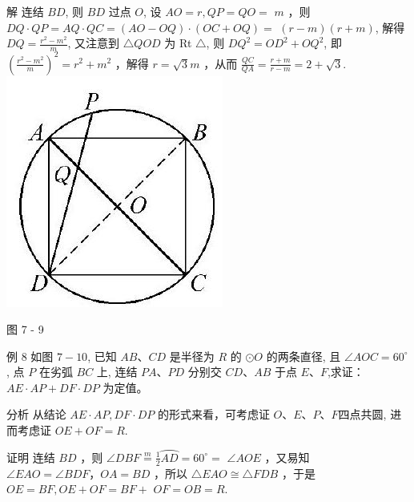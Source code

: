 \documentclass[10pt]{article}
\begin{document}
解 连结 $B D$, 则 $B D$ 过点 $O$, 设 $A O=r, Q P=Q O=$ $m$ ，则 $D Q \cdot Q P=A Q \cdot Q C=(A O-O Q) \cdot(O C+O Q)=$ $(r-m)(r+m)$, 解得 $D Q=\frac{r^{2}-m^{2}}{m}$, 又注意到 $\triangle Q O D$ 为 Rt $\triangle$, 则 $D Q^{2}=O D^{2}+O Q^{2}$, 即 $\left(\frac{r^{2}-m^{2}}{m}\right)^{2}=r^{2}+m^{2}$ ，解得 $r=\sqrt{3} m$ ，从而 $\frac{Q C}{Q A}=\frac{r+m}{r-m}=2+\sqrt{3}$.\\
\includegraphics[max width=\textwidth, center]{2024_10_30_66b8e5e701da2093c133g-054(2)}

图 7 - 9

例 8 如图 $7-10$, 已知 $A B 、 C D$ 是半径为 $R$ 的 $\odot O$ 的两条直径, 且 $\angle A O C=60^{\circ}$, 点 $P$ 在劣弧 $B C$ 上, 连结 $P A 、 P D$ 分别交 $C D 、 A B$ 于点 $E 、 F$,求证： $A E \cdot A P+D F \cdot D P$ 为定值。

分析 从结论 $A E \cdot A P, D F \cdot D P$ 的形式来看，可考虑证 $O 、 E 、 P 、 F$四点共圆, 进而考虑证 $O E+O F=R$.

证明 连结 $B D$ ，则 $\angle D B F \stackrel{m}{=} \frac{1}{2} \overparen{A D}=60^{\circ}=$ $\angle A O E$ ，又易知 $\angle E A O=\angle B D F ， O A=B D$ ，所以 $\triangle E A O \cong \triangle F D B$ ，于是 $O E=B F, O E+O F=B F+$ $O F=O B=R$.
\end{document}
